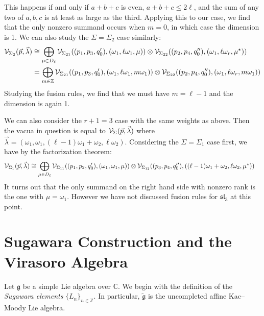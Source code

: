 \documentclass[12pt]{article}
\begin{document}
\begin{example}
This happens if and only if $a+b+c$ is even, $a+b+c \le 2\ell$, and the sum of any two of $a,b,c$ is at least as large as the third. Applying this to our case, we find that the only nonzero summand occurs when $m=0$, in which case the dimension is 1. We can also study the $\Sigma = \Sigma_2$ case similarly:
\begin{align*}
        {\mathcal{V}}_{\Sigma_2}(\vec p, \vec \lambda) &\cong \bigoplus_{\mu \in D_\ell} {\mathcal{V}}_{\Sigma_{21}}((p_1,p_3,q'_0), (\omega_1, \ell \omega_1, \mu)) \otimes {\mathcal{V}}_{\Sigma_{22}}((p_2,p_4,q''_0), (\omega_1, \ell \omega_r, \mu^\star)) \\
        &= \bigoplus_{m\in \mathbb{Z}} {\mathcal{V}}_{\Sigma_{21}}((p_1,p_3,q'_0), (\omega_1, \ell \omega_1, m \omega_1)) \otimes {\mathcal{V}}_{\Sigma_{22}}((p_2,p_4,q''_0), (\omega_1, \ell \omega_r, m \omega_1))
    \end{align*}
    Studying the fusion rules, we find that we must have $m = \ell - 1$ and the dimension is again 1. 
\end{example}

\begin{example}
    We can also consider the $r+1 = 3$ case with the same weights as above. Then the vacua in question is equal to ${\mathcal{V}}_{\Sigma}(\vec p, \vec \lambda)$ where $\vec \lambda = (\omega_1, \omega_1, (\ell - 1)\omega_1 + \omega_2, \ell \omega_2)$. Considering the $\Sigma = \Sigma_1$ case first, we have by the factorization theorem:
     \begin{align*}
        {\mathcal{V}}_{\Sigma_1}(\vec p, \vec \lambda) &\cong \bigoplus_{\mu \in D_\ell} {\mathcal{V}}_{\Sigma_{11}}((p_1,p_2,q'_0), (\omega_1, \omega_1, \mu)) \otimes {\mathcal{V}}_{\Sigma_{12}}((p_3,p_4,q''_0), ((\ell - 1)\omega_1 + \omega_2, \ell \omega_2, \mu^\star))
    \end{align*}
It turns out that the only summand on the right hand side with nonzero rank is the one
with $\mu = \omega_1$. However we have not discussed fusion rules for $\mathfrak{sl}_3$ at this point.
\end{example}

\section*{Sugawara Construction and the Virasoro Algebra}

Let $\mathfrak{g}$ be a simple Lie algebra over $\mathbb{C}$.  
We begin with the definition of the \emph{Sugawara elements} $\{L_n\}_{n\in\mathbb{Z}}$.  
In particular, $\widetilde{\mathfrak{g}}$ is the uncompleted affine Kac--Moody Lie algebra.
\end{document}
